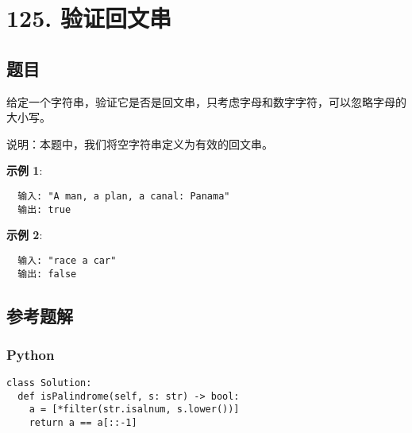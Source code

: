 \newpage
\section{125. 验证回文串}
\label{leetcode:125}

\subsection{题目}

给定一个字符串，验证它是否是回文串，只考虑字母和数字字符，可以忽略字母的大小写。

说明：本题中，我们将空字符串定义为有效的回文串。

\textbf{示例 1}:

\begin{verbatim}
  输入: "A man, a plan, a canal: Panama"
  输出: true
\end{verbatim}

\textbf{示例 2}:

\begin{verbatim}
  输入: "race a car"
  输出: false
\end{verbatim}

\subsection{参考题解}

\subsubsection{Python}

\begin{verbatim}
class Solution:
  def isPalindrome(self, s: str) -> bool:
    a = [*filter(str.isalnum, s.lower())]
    return a == a[::-1]
\end{verbatim}
